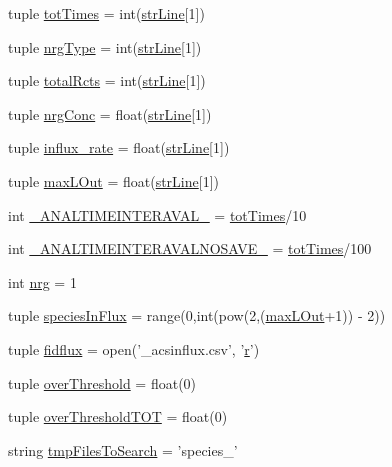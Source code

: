 \begin{DoxyCompactItemize}
tuple \hyperlink{a00102_a20df40e09bc9514382d71f15783c7856}{tot\-Times} = int(\hyperlink{a00102_a072631e11db72789389935b0f9efff8d}{str\-Line}\mbox{[}1\mbox{]})
\item 
tuple \hyperlink{a00102_a0d0c83fd90489be59b1f5a31dadf4469}{nrg\-Type} = int(\hyperlink{a00102_a072631e11db72789389935b0f9efff8d}{str\-Line}\mbox{[}1\mbox{]})
\item 
tuple \hyperlink{a00102_a9f0e87ff21f3597668f5ad076224da87}{total\-Rcts} = int(\hyperlink{a00102_a072631e11db72789389935b0f9efff8d}{str\-Line}\mbox{[}1\mbox{]})
\item 
tuple \hyperlink{a00102_a24d5f5a61d56c596017396ad272ef4a4}{nrg\-Conc} = float(\hyperlink{a00102_a072631e11db72789389935b0f9efff8d}{str\-Line}\mbox{[}1\mbox{]})
\item 
tuple \hyperlink{a00102_a3a8adee26325d72aca909e91b0fd3ea5}{influx\-\_\-rate} = float(\hyperlink{a00102_a072631e11db72789389935b0f9efff8d}{str\-Line}\mbox{[}1\mbox{]})
\item 
tuple \hyperlink{a00102_a47da7b9153a0e4a33512f6d2675b8c1a}{max\-L\-Out} = float(\hyperlink{a00102_a072631e11db72789389935b0f9efff8d}{str\-Line}\mbox{[}1\mbox{]})
\item 
int \hyperlink{a00102_a46f1fb71bdcdb1c8679ae847d0d4b63f}{\-\_\-\-A\-N\-A\-L\-T\-I\-M\-E\-I\-N\-T\-E\-R\-A\-V\-A\-L\-\_\-} = \hyperlink{a00102_a20df40e09bc9514382d71f15783c7856}{tot\-Times}/10
\item 
int \hyperlink{a00102_a7665e828ed7f27f4ba353e9645ad716d}{\-\_\-\-A\-N\-A\-L\-T\-I\-M\-E\-I\-N\-T\-E\-R\-A\-V\-A\-L\-N\-O\-S\-A\-V\-E\-\_\-} = \hyperlink{a00102_a20df40e09bc9514382d71f15783c7856}{tot\-Times}/100
\item 
int \hyperlink{a00102_a948683f966c62ac856582281c3cda1f4}{nrg} = 1
\item 
tuple \hyperlink{a00102_a36f6b63269e716f42cd38a36a781a4cf}{species\-In\-Flux} = range(0,int(pow(2,(\hyperlink{a00102_a47da7b9153a0e4a33512f6d2675b8c1a}{max\-L\-Out}+1)) -\/ 2))
\item 
tuple \hyperlink{a00102_a0c40e4d9928e8df792b31c7a431d3fba}{fidflux} = open('\-\_\-acsinflux.\-csv', '\hyperlink{a00031_ac862e7284527eb913b1351c8bfb8e079}{r}')
\item 
tuple \hyperlink{a00102_a12e61f8d7aadb52256a7728af342bae3}{over\-Threshold} = float(0)
\item 
tuple \hyperlink{a00102_a93de20dd9ebf791127ac5aefc0a2df8d}{over\-Threshold\-T\-O\-T} = float(0)
\item 
string \hyperlink{a00102_a141356fc914110fdf3ec4f0fc3beaab5}{tmp\-Files\-To\-Search} = 'species\-\_\-'

\end{DoxyCompactItemize}
